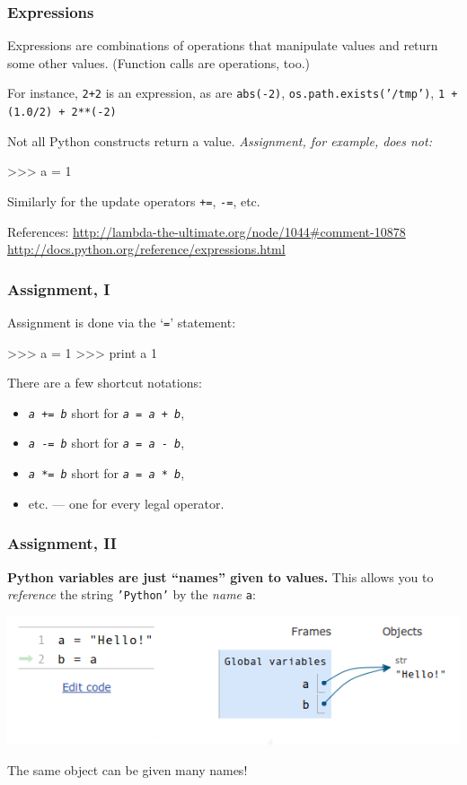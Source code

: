\documentclass[english,serif,mathserif,xcolor=pdftex,dvipsnames,table]{beamer}
\begin{document}
\begin{frame}[fragile]
  \frametitle{Expressions}

  Expressions are combinations of operations that manipulate values
  and return some other values.  (Function calls are operations, too.)

  \+
  For instance, \texttt{2+2} is an expression, as are
  \texttt{abs(-2)}, \texttt{os.path.exists('/tmp')},
  \texttt{1 + (1.0/2) + 2**(-2)}

  \+
  Not all Python constructs return a value.
  \emph{Assignment, for example, does not:}
\begin{semiverbatim}
>>> a = 1
\end{semiverbatim}
  Similarly for the update operators \texttt{+=}, \texttt{-=}, etc.

  \+\scriptsize
  References:
  \url{http://lambda-the-ultimate.org/node/1044#comment-10878}
  \url{http://docs.python.org/reference/expressions.html}

\end{frame}


\begin{frame}[fragile]
  \frametitle{Assignment, I}
  Assignment is done via the `\texttt{=}' statement:
\begin{semiverbatim}
>>> a = 1
>>> print a
1
\end{semiverbatim}

  \+
  There are a few shortcut notations:
  \begin{itemize}
  \item[] \texttt{\emph{a} += \emph{b}} short for \texttt{\emph{a} = \emph{a} + \emph{b}},
  \item[] \texttt{\emph{a} -= \emph{b}} short for \texttt{\emph{a} = \emph{a} - \emph{b}},
  \item[] \texttt{\emph{a} *= \emph{b}} short for \texttt{\emph{a} = \emph{a} * \emph{b}},
  \item[]   etc. --- one for every legal operator.
  \end{itemize}
\end{frame}


\begin{frame}[fragile]
  \frametitle{Assignment, II}

  \textbf{Python variables are just ``names'' given to values.}
  This allows you to \emph{reference} the string \texttt{'Python'}
  by the \emph{name} \texttt{a}:

  \+
  \includegraphics[width=1\linewidth]{fig/a=b.png}

  \+
  The same object can be given many names!
\end{frame}
\end{document}
